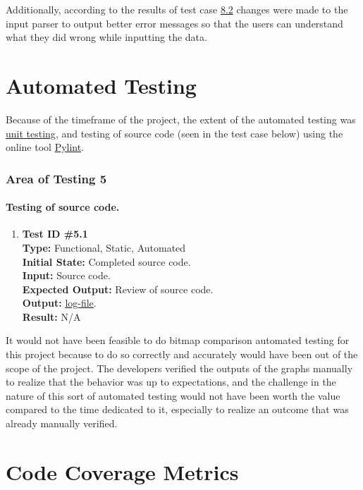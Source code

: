 \documentclass[12pt, titlepage]{article}
\begin{document}
Additionally, according to the results of test case \hyperref[sec:8.2]{8.2} changes were made to the input parser to output better error messages so that the users can understand what they did wrong while inputting the data.
\section{Automated Testing}
Because of the timeframe of the project, the extent of the automated testing was \hyperref[sec:unittest]{unit testing}, and testing of source code (seen in the test case below) using the online tool \href{https://www.pylint.org}{Pylint}.



\subsubsection{Area of Testing 5}		
	\paragraph{Testing of source code.}
		\begin{enumerate}
			\item{\textbf{Test ID \#5.1\\}}
			\textbf{Type:} Functional, Static, Automated\\
			\textbf{Initial State:} Completed source code. \\
			\textbf{Input:} Source code.\\
			\textbf{Expected Output:} Review of source code.\\
			\textbf{Output:}	 \href{run:code_eval.txt} {\underline{log-file}}.\\
			\textbf{Result:} N/A
		\end{enumerate}

It would not have been feasible to do bitmap comparison automated testing for this project because to do so correctly and accurately would have been out of the scope of the project. The developers verified the outputs of the graphs manually to realize that the behavior was up to expectations, and the challenge in the nature of this sort of automated testing would not have been worth the value compared to the time dedicated to it, especially to realize an outcome that was already manually verified.
		

\section{Code Coverage Metrics} %


\end{document}
